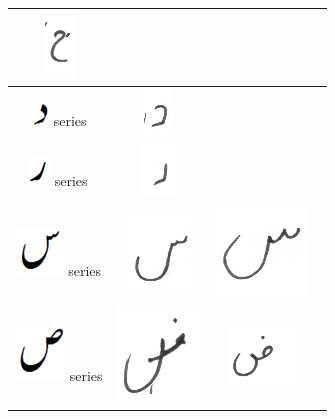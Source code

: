 \begin{table}[h]
\begin{tabular}{@{}cccc@{}}
\includegraphics[scale=0.15]{188}  \\
\hline
\includegraphics[scale=0.25]{daal_orig} series & \includegraphics[scale=0.15]{189} & &  \\
\hline
\includegraphics[scale=0.25]{re_orig} series & \includegraphics[scale=0.15]{190} &  &  \\
\hline
\includegraphics[scale=0.25]{seen_orig} series & \includegraphics[scale=0.15]{191} & 
\includegraphics[scale=0.15]{192} &  \\
\hline
\includegraphics[scale=0.20]{suad_orig} series & \includegraphics[scale=0.15]{193} & \includegraphics[scale=0.15]{194} &  \\

\end{tabular}
\end{table}
